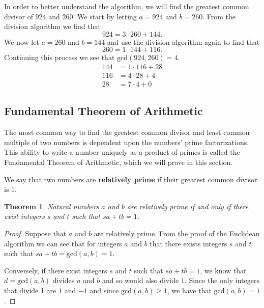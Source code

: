 \documentclass[
]{book}
\newtheorem{theorem}{Theorem}[chapter]
\theoremstyle{definition}
\theoremstyle{definition}
\theoremstyle{definition}
\theoremstyle{remark}
\begin{document}
In order to better understand the algorithm, we will find the greatest common divisor of \(924\) and \(260\). We start by letting \(a=924\) and \(b=260\). From the division algorithm we find that
\[924 = 3 \cdot 260+144.\] We now let \(a=260\) and \(b=144\) and use the division algorithm again to find that \[260=1\cdot 144 + 116.\] Continuing this process we see that \(\mathrm{gcd}(924,260)=4\).
\begin{align*}
144 &=1\cdot 116 + 28 \\
116 &= 4 \cdot 28 + 4 \\
28 &= 7\cdot 4 + 0 
\end{align*}

\hypertarget{fundamental-theorem-of-arithmetic}{%
\subsection{Fundamental Theorem of Arithmetic}\label{fundamental-theorem-of-arithmetic}}

The most common way to find the greatest common divisor and least common multiple of two numbers is dependent upon the numbers' prime factorizations. This ability to write a number uniquely as a product of primes is called the Fundamental Theorem of Arithmetic, which we will prove in this section.

We say that two numbers are \textbf{relatively prime} if their greatest common divisor is \(1\).

\begin{theorem}
\protect\hypertarget{thm:relatively-prime}{}{\label{thm:relatively-prime} }Natural numbers \(a\) and \(b\) are relatively prime if and only if there exist integers \(s\) and \(t\) such that \(sa+tb=1\).
\end{theorem}

\begin{proof}
{}Suppose that \(a\) and \(b\) are relatively prime. From the proof of the Euclidean algorithm we can see that for integers \(a\) and \(b\) that there exists integers \(s\) and \(t\) such that \(sa+tb=\mathrm{gcd}(a,b)=1\).

Conversely, if there exist integers \(s\) and \(t\) such that \(sa+tb=1\), we know that \(d=\mathrm{gcd}(a,b)\) divides \(a\) and \(b\) and so would also divide \(1\). Since the only integers that divide 1 are \(1\) and \(-1\) and since \(\mathrm{gcd}(a,b)\geq 1\), we have that \(\mathrm{gcd}(a,b)=1\).
\end{proof}
\end{document}

